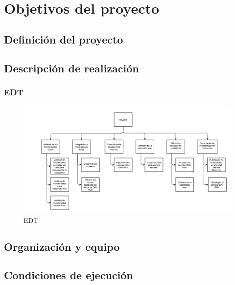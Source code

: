 \chapter{Objetivos del proyecto}

\section{Definición del proyecto}





\section{Descripción de realización}




\subsection{EDT}

\begin{figure}[!htp]
	\centering
	\includegraphics[angle=-90, scale=.5]{fig/edt}
	\caption{EDT}
\end{figure}



\section{Organización y equipo}




\section{Condiciones de ejecución}



